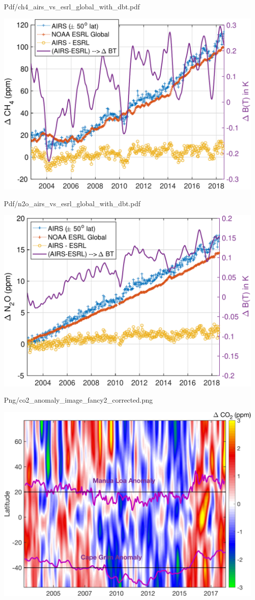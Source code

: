 \documentclass[presentation]{beamer}
\begin{document}
\begin{frame}[label={sec:org52cd834}]{Pdf/ch4\_airs\_vs\_esrl\_global\_with\_dbt.pdf}
\begin{center}
\includegraphics[width=0.7\linewidth]{./Figs/Pdf/ch4_airs_vs_esrl_global_with_dbt.pdf}
\end{center}
\end{frame}

\begin{frame}[label={sec:orgc3e65a7}]{Pdf/n2o\_airs\_vs\_esrl\_global\_with\_dbt.pdf}
\begin{center}
\includegraphics[width=0.7\linewidth]{./Figs/Pdf/n2o_airs_vs_esrl_global_with_dbt.pdf}
\end{center}
\end{frame}

\begin{frame}[label={sec:org5422f83}]{Png/co2\_anomaly\_image\_fancy2\_corrected.png}
\begin{center}
\includegraphics[width=0.7\linewidth]{./Figs/Png/co2_anomaly_image_fancy2_corrected.png}
\end{center}
\end{frame}
\end{document}
